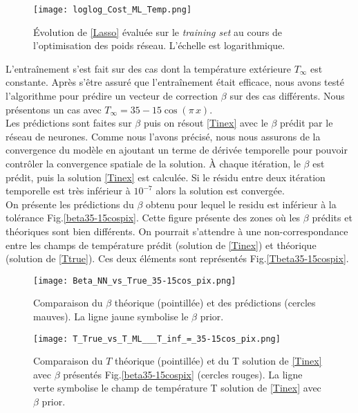 \documentclass[a4paper,12pt]{article}
\newcommand{\tinf}{$T_\infty$}
\numberwithin{equation}{section} %
\begin{document}
\begin{figure}[!ht]
\centering
\texttt{[image: loglog\_Cost\_ML\_Temp.png]}
\caption{\small{Évolution de \eqref{Lasso} évaluée sur le \textit{training set} au cours de l'optimisation des poids réseau. L'échelle est logarithmique.}}
\label{loglog_tempCost} \vspace{-3mm}
\end{figure}
\noindent L'entraînement s'est fait sur des cas dont la température extérieure \tinf $ $ est constante. Après s'être assuré que l'entraînement était efficace, nous avons testé l'algorithme pour prédire un vecteur de correction $\beta$ sur des cas différents. Nous présentons un cas avec $T_\infty =  35 - 15 \cos(\pi\,x)$.\\

\noindent Les prédictions sont faites sur $\beta$ puis on résout \eqref{Tinex} avec le $\beta$ prédit par le réseau de neurones. Comme nous l'avons précisé, nous nous assurons de la convergence du modèle en ajoutant un terme de dérivée temporelle pour pouvoir contrôler la convergence spatiale de la solution. À chaque itération, le $\beta$ est prédit, puis la solution \eqref{Tinex} est calculée. Si le résidu entre deux itération temporelle est très inférieur à $10^{-7}$ alors la solution est convergée.\\
On présente les prédictions du $\beta$ obtenu pour lequel le residu est inférieur à la tolérance Fig.\eqref{beta35-15cospix}. Cette figure présente des zones où les $\beta$ prédits et théoriques sont bien différents. On pourrait s'attendre à une non-correspondance entre les champs de température prédit (solution de \eqref{Tinex}) et théorique (solution de \eqref{Ttrue}). Ces deux éléments sont représentés Fig.\eqref{Tbeta35-15cospix}.
\vspace{-0.3cm}
\begin{figure}[!ht]
\centering
\texttt{[image: Beta\_NN\_vs\_True\_35-15cos\_pix.png]}
\vspace{-3mm}
\caption{\small{Comparaison du $\beta$ théorique (pointillée) et des prédictions (cercles mauves). La ligne jaune symbolise le $\beta$ prior.}}
\label{beta35-15cospix}
\end{figure}

\begin{figure}[!ht]
\centering
\texttt{[image: T\_True\_vs\_T\_ML\_\_\_T\_inf\_=\_35-15cos\_pix.png]}
\vspace{-3mm}
\caption{\small{Comparaison du $T$ théorique (pointillée) et du T solution de \eqref{Tinex} avec $\beta$ présentés Fig.\eqref{beta35-15cospix} (cercles rouges). La ligne verte symbolise le champ de température T solution de \eqref{Tinex} avec $\beta$ prior.}}
\label{Tbeta35-15cospix}
\end{figure}
\end{document}

